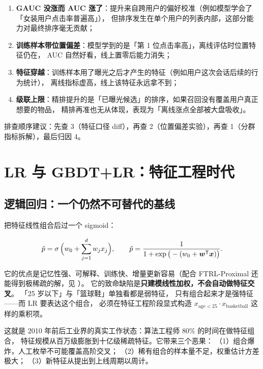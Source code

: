 \begin{pitfall}
\begin{enumerate}
  \item \textbf{GAUC 没涨而 AUC 涨了}：提升来自跨用户的偏好校准（例如模型学会了「女装用户点击率普遍高」），
        但排序发生在单个用户的列表内部，这部分能力对最终排序毫无贡献；
  \item \textbf{训练样本带位置偏差}：模型学到的是「第 1 位点击率高」，离线评估时位置特征仍在，
        AUC 自然好看，线上置零后能力消失；
  \item \textbf{特征穿越}：训练样本用了曝光之后才产生的特征（例如用户这次会话后续的行为统计），
        离线指标虚高，线上该特征永远拿不到；
  \item \textbf{级联上限}：精排提升的是「已曝光候选」的排序，如果召回没有覆盖用户真正想要的物品，
        精排再准也无从体现，表现为「离线涨点全部被大盘吸收」。
\end{enumerate}
排查顺序建议：先查 3（特征口径 diff），再查 2（位置偏差实验），再查 1（分群指标拆解），最后归因 4。
\end{pitfall}

\section{LR 与 GBDT+LR：特征工程时代}

\subsection{逻辑回归：一个仍然不可替代的基线}

 把特征线性组合后过一个 sigmoid：

\begin{equation}
\hat{p} = \operatorname{\sigma}\Big( w_0 + \sum_{j=1}^{d} w_j x_j \Big),
\qquad
\hat{p} = \frac{1}{1 + \exp\big(-(w_0 + \bm{w}^{\mathsf{T}} \bm{x})\big)} .
\label{eq:lr}
\end{equation}

它的优点是记忆性强、可解释、训练快、增量更新容易（配合 FTRL-Proximal
还能得到极稀疏的解，见 \cite{mcmahan2013ftrl}）。
它的致命缺陷是\textbf{只建模线性加权，不会自动做特征交叉}。
「25 岁以下」与「篮球鞋」单独看都是弱特征，
只有组合起来才是强特征——而 LR 要表达这个组合，
必须在特征工程阶段显式构造 $x_{\text{age}<25} \cdot x_{\text{basketball}}$ 这样的乘积项。

这就是 2010 年前后工业界的真实工作状态：算法工程师 80\% 的时间在做特征组合，
特征规模从百万级膨胀到十亿级稀疏特征。它带来三个恶果：
（1）组合爆炸，人工枚举不可能覆盖高阶交叉；
（2）稀有组合的样本量不足，权重估计方差极大；
（3）新特征从提出到上线周期以周计。

